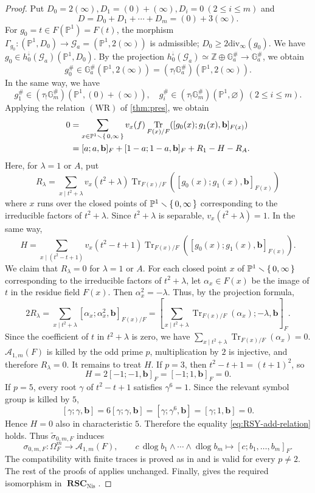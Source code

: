 \documentclass[a4paper,12pt,reqno]{amsart}
\numberwithin{equation}{section}
\theoremstyle{definition}
\newcommand{\Z}{\mathbb{Z}}
\newcommand{\bP}{\mathbb{P}}
\DeclareMathOperator{\dlog}{dlog}
\DeclareMathOperator{\Tr}{Tr}
\newcommand{\bcube}{{\overline{\square}}}
\newcommand{\RSC}{{\operatorname{\mathbf{RSC}}}}
\newcommand{\Acal}{\mathcal{A}}
\newcommand{\GaSharp}{\mathbb{G}_{a}^{\#}}
\newcommand{\GmSharp}{\mathbb G_m^{\#}}
\newcommand{\Nis}{\mathrm{Nis}}
\newcommand{\Gapair}{\mathcal{G}_a}
\newcommand{\vb}{\mathbf{b}}
\begin{document}
\begin{proof}
Put 
$D_0 = 2(\infty), D_1 = (0)+ (\infty), D_i = 0\ (2\leq i\leq m)$ 
and 
\[
D  = D_0 + D_1 + \cdots + D_m = (0) + 3(\infty).
\]
For $g_0 = t \in F(\bP^1) = F(t)$, 
the morphism  $\Gamma_{g_0}\colon (\bP^1, D_0)\to \Gapair =(\bP^1,2(\infty))$ 
is admissible; 
$D_0 \geq 2\mathrm{div}_\infty(g_0)$. 
We have $g_0 \in h_0^{\bcube}(\Gapair)(\bP^1,D_0)$. 
By the projection $h_0^{\bcube}(\Gapair)\simeq \Z \oplus \GaSharp\to \GaSharp$, we obtain 
\[
g_0^\#\in \GaSharp(\bP^1,2(\infty)) = (\tau_!\GaSharp)(\bP^1,2(\infty)).
\]
In the same way, we have 
\[
 g_1^\#\in(\tau_!\GmSharp)(\bP^1,(0)+(\infty)),\quad g_i^\# \in (\tau_!\GmSharp)(\bP^1,\varnothing)\ (2\le i\le m).
\]
Applying the relation $\mathrm{(WR)}$ of \autoref{thm:pres}, we obtain
\begin{align*}
	 0 &= \sum_{x \in \bP^1\smallsetminus \set{0,\infty}}v_x(f) \Tr_{F(x)/F}([g_0(x);g_1(x), \vb]_{F(x)}) \\
 &=[a;a,\vb]_F+[1-a;1-a,\vb]_F
 +R_1-H-R_A.
\end{align*}
Here, 
for $\lambda = 1$ or $A$, put 
\[
R_\lambda = \sum_{x \mid t^2+ \lambda}v_x(t^2+\lambda)\Tr_{F(x)/F}([g_0(x);g_1(x), \vb]_{F(x)})
\]
where $x$ runs over the closed points of $\bP^1\smallsetminus \set{0,\infty}$ 
corresponding to the irreducible factors of $t^2+\lambda$. 
Since $t^2 + \lambda$ is separable, $v_x(t^2+ \lambda) = 1$. 
In the same way, 
\[
H = \sum_{ x\mid (t^2 - t+1)}v_x(t^2-t+1) \Tr_{F(x)/F}([g_0(x);g_1(x), \vb]_{F(x)}).
\]
We claim that $R_\lambda=0$ for $\lambda =1$ or $A$. 
For each closed point $x$ of $\bP^1 \smallsetminus \set{0,\infty}$ 
corresponding to the irreducible factors of $t^2+\lambda$, 
let $\alpha_x \in F(x)$ be the image of $t$ in the residue field $F(x)$.  
Then $\alpha_x^2 = -\lambda$. 
Thus, by the projection formula,
\[
 2R_\lambda=
 \sum_{x\mid t^2+ \lambda} 
 [\alpha_x;\alpha_x^2,\vb]_{F(x)/F} 
 =
 \left[
 \sum_{x\mid t^2 + \lambda}\Tr_{F(x)/F}(\alpha_x);
 -\lambda,\vb
 \right]_F.
\]
Since the coefficient of $t$ in $t^2+\lambda$ is zero, 
we have $\sum_{x\mid t^2+\lambda} \Tr_{F(x)/F}(\alpha_x) = 0.$
$\Acal_{1,m}(F)$ is killed by the odd prime $p$, multiplication by $2$
is injective, and therefore $R_\lambda=0$.
It remains to treat $H$. 
If $p=3$, then $t^2-t+1=(t+1)^2$,
so
\[
 H=2[-1;-1,\vb]_F=[-1;1,\vb]_F=0.
\]
If $p=5$, every root $\gamma$ of $t^2-t+1$ satisfies
$\gamma^6=1$.  Since the relevant symbol group is killed by $5$,
\[
 [\gamma;\gamma,\vb]
 =
 6[\gamma;\gamma,\vb]
 =
 [\gamma;\gamma^6,\vb]
 =
 [\gamma;1,\vb]
 =0.
\]
Hence $H=0$ also in characteristic $5$.
Therefore the equality 
\eqref{eq:RSY-add-relation} holds.  
Thus $\widetilde  \sigma_{0,m,F}$ induces
\[
 \sigma_{0,m,F}:\Omega_F^m\to\Acal_{1,m}(F),
 \qquad
 c\,\dlog b_1\wedge\cdots\wedge \dlog b_m
 \mapsto[c;b_1,\ldots,b_m]_F.
\]
The compatibility with finite traces is proved as in
\cite[proof of Proposition~5.18, (5.18.3)--(5.18.4)]{RSY22} 
and is valid for every $p\neq 2$.
The rest of the proofs of
\cite[Proposition~5.18 and Theorem~5.19]{RSY22} applies unchanged.
Finally, \cite[Lemma~4.16]{RSY22} gives the required isomorphism in
$\RSC_{\Nis}$.
\end{proof}
\end{document}
